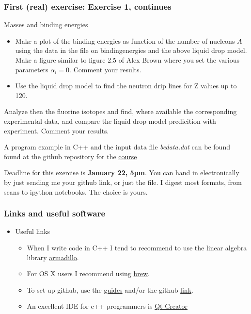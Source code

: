 \documentclass{beamer}
\begin{document}
\begin{frame}
\frametitle{First (real) exercise: Exercise 1, continues}

\begin{block}{Masses and binding energies }
\begin{itemize}
 \item Make a plot of the binding energies as function of the number of nucleons $A$ using the data in the file on bindingenergies and the above liquid drop model.  Make a figure similar to figure 2.5 of Alex Brown where you set the various parameters $\alpha_i=0$. Comment your results. 

 \item Use the liquid drop model to find the neutron drip lines   for Z values up to 120.
\end{itemize}

\noindent
Analyze then the fluorine isotopes and find, where available the corresponding experimental data, and compare the liquid drop model predicition with experiment. 
Comment your results.

A program example in C++ and the input data file \emph{bedata.dat} can be found found at the github repository for the \href{{https://github.com/NuclearStructure/PHY981/tree/master/doc/pub/spdata/programs}}{course}

Deadline for this exercise is \textbf{January 22, 5pm}.  You can hand in electronically by just sending me your github link, or just the file. I digest most formats, from scans to ipython notebooks. The choice is yours. 
\end{block}
\end{frame}

\begin{frame}
\frametitle{Links and useful software}

\begin{block}{}
\begin{itemize}
\item Useful links
\begin{itemize}

 \item When I write code in C++ I tend to recommend to use the linear algebra library \href{{http://arma.sourceforge.net/}}{armadillo}. 

 \item For OS X users I recommend using \href{{http://brew.sh/}}{brew}.

 \item To set up github, use the \href{{https://guides.github.com/}}{guides} and/or the github \href{{https://github.com/}}{link}. 

 \item An excellent IDE for c++ programmers is \href{{http://www.qt.io/ide/}}{Qt Creator}
\end{itemize}

\noindent
\end{itemize}

\noindent
\end{block}
\end{frame}
\end{document}
